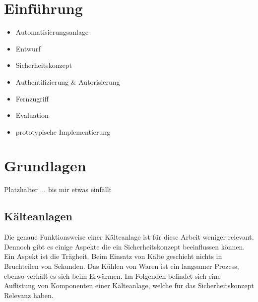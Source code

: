 \documentclass[11pt,a4paper]{report}
\begin{document}

\tableofcontents
\clearpage 


\chapter{Einführung} \label{chap:intro}

\begin{itemize}
\item Automatisierungsanlage
\item Entwurf 
\item Sicherheitskonzept
\item Authentifizierung \& Autorisierung
\item Fernzugriff
\item Evaluation
\item prototypische Implementierung
\end{itemize}

\chapter{Grundlagen} \label{chap:basics}

Platzhalter ... bis mir etwas einfällt

\section{Kälteanlagen}

Die genaue Funktionsweise einer Kälteanlage ist für diese Arbeit weniger relevant. Dennoch gibt es einige Aspekte die ein Sicherheitskonzept beeinflussen können. Ein Aspekt ist die Trägheit. Beim Einsatz von Kälte geschieht nichts in Bruchteilen von Sekunden. Das Kühlen von Waren ist ein langsamer Prozess, ebenso verhält es sich beim Erwärmen. Im Folgenden befindet sich eine Auflistung von Komponenten einer Kälteanlage, welche für das Sicherheitskonzept Relevanz haben.
\end{document}

